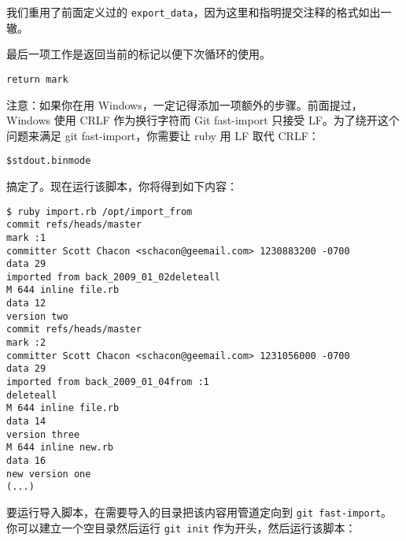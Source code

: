 \documentclass[a4paper]{book}
\begin{document}
我们重用了前面定义过的 \texttt{export\_data}，因为这里和指明提交注释的格式如出一辙。

最后一项工作是返回当前的标记以便下次循环的使用。

\begin{shaded}\begin{verbatim}
return mark
\end{verbatim}\end{shaded}

注意：如果你在用 Windows，一定记得添加一项额外的步骤。前面提过，Windows 使用 CRLF 作为换行字符而 Git fast-import 只接受 LF。为了绕开这个问题来满足 git fast-import，你需要让 ruby 用 LF 取代 CRLF：

\begin{shaded}\begin{verbatim}
$stdout.binmode
\end{verbatim}\end{shaded}

搞定了。现在运行该脚本，你将得到如下内容：

\begin{shaded}\begin{verbatim}
$ ruby import.rb /opt/import_from 
commit refs/heads/master
mark :1
committer Scott Chacon <schacon@geemail.com> 1230883200 -0700
data 29
imported from back_2009_01_02deleteall
M 644 inline file.rb
data 12
version two
commit refs/heads/master
mark :2
committer Scott Chacon <schacon@geemail.com> 1231056000 -0700
data 29
imported from back_2009_01_04from :1
deleteall
M 644 inline file.rb
data 14
version three
M 644 inline new.rb
data 16
new version one
(...)
\end{verbatim}\end{shaded}

要运行导入脚本，在需要导入的目录把该内容用管道定向到 \texttt{git fast-import}。你可以建立一个空目录然后运行 \texttt{git init} 作为开头，然后运行该脚本：
\end{document}
